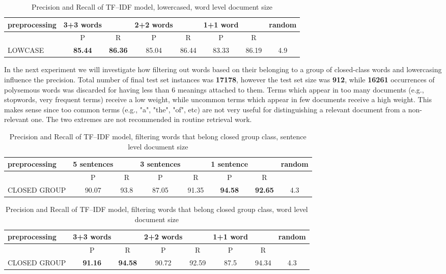 \begin{table}[h!]
\begin{tabular}{ l | c c | c c | c c | c}
   preprocessing &  3+3 words && 2+2 words && 1+1 word  && random\\
\hline\hline
	& P  &  R & P  &  R & P  &  R &\\
\hline
LOWCASE  & \textbf{85.44}  &  \textbf{86.36} &  85.04 & 86.44 & 83.33  & 86.19  & 4.9 \\
\end{tabular}
\caption{Precision and Recall of TF--IDF model, lowercased, word level document size}
\end{table}

In the next experiment we 
will investigate how filtering out words based on their belonging to a group of closed-class words and 
lowercasing influence the precision. Total number of final test set instances was  \textbf{17178}, however the test set size was  \textbf{912}, while \textbf{16261} occurrences of polysemous words was discarded  for having less than 6 meanings attached to them. 
Terms which appear in too many documents (e.g., stopwords, very 
frequent terms) receive a low weight, while uncommon terms which appear in few documents receive a 
high weight. This makes sense since too common terms (e.g., "a", "the", "of", etc) are not very useful for 
distinguishing a relevant document from a non-relevant one. The two extremes are not recommended in routine retrieval work. 

\begin{table}[h!]
\begin{tabular}{ l | c c | c c | c c | c}
   preprocessing &  5 sentences && 3 sentences && 1 sentence  && random\\
\hline
	& P  &  R & P  &  R & P  &  R &\\
\hline\hline
CLOSED GROUP & 90.07 & 93.8  & 87.05  & 91.35  & \textbf{94.58}  & \textbf{92.65}  & 4.3  \\
\end{tabular}
\caption{Precision and Recall of TF--IDF model, filtering words that belong closed group class, sentence level document size}
\end{table}

\begin{table}[h!]
\begin{tabular}{ l | c c | c c | c c | c}
   preprocessing &  3+3 words && 2+2 words && 1+1 word  && random\\
\hline\hline
	& P  &  R & P  &  R & P  &  R &\\
\hline
CLOSED GROUP & \textbf{91.16}  & \textbf{94.58} & 90.72 & 92.59 & 87.5  & 94.34  & 4.3  \\
\end{tabular}
\caption{Precision and Recall of TF--IDF model, filtering words that belong closed group class, word level document size}
\end{table}

